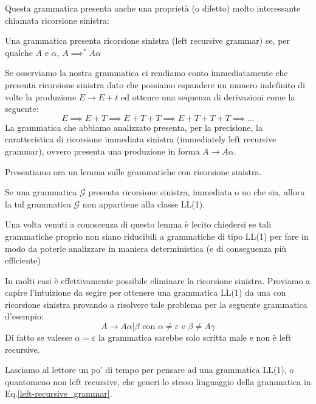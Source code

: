 \documentclass[class=book, crop=false, oneside, 12pt]{standalone}
\begin{document}
Questa grammatica presenta anche una proprietà (o difetto) molto interessante chiamata ricorsione sinistra:
\begin{definition}
    Una grammatica presenta ricorsione sinistra (left recursive grammar) se, per qualche \(A\) e \(\alpha\), \(A \implies^* A\alpha\)
\end{definition}

Se osserviamo la nostra grammatica ci rendiamo conto immediatamente che presenta ricorsione sinistra dato che possiamo espandere un numero indefinito di volte la produzione \(E \to E+t\) ed ottenre una sequenza di derivazioni come la seguente:
\begin{equation*}
    E \implies E+T \implies E+T+T \implies E+T+T+T \implies \dots
\end{equation*}
La grammatica che abbiamo analizzato presenta, per la precisione, la caratteristica di ricorsione immediata sinistra (immediately left recursive grammar), ovvero presenta una produzione in forma \(A \to A\alpha\).

Presentiamo ora un lemma sulle grammatiche con ricorsione sinistra.
\begin{lemma}
    Se una grammatica \(\mathcal{G}\) presenta ricorsione sinistra, immediata o no che sia, allora la tal grammatica \(\mathcal{G}\) non appartiene alla classe LL(1).
\end{lemma}
Una volta venuti a conoscenza di questo lemma è lecito chiedersi se tali grammatiche proprio non siano riducibili a grammatiche di tipo LL(1) per fare in modo da poterle analizzare in maniera deterministica (e di conseguenza più efficiente)

In molti casi è effettivamente possibile eliminare la ricorsione sinistra. 
Proviamo a capire l'intuizione da segire per ottenere una grammatica LL(1) da una con ricorsione sinistra provando a risolvere tale problema per la seguente grammatica d'esempio:
\begin{equation}
    \label{left-recursive_grammar}
    A \to A \alpha | \beta \textrm{  con  } \alpha \neq \varepsilon \textrm{  e  } \beta \neq A \gamma
\end{equation}
Di fatto se valesse \(\alpha = \varepsilon\) la grammatica sarebbe solo scritta male e non è left recursive.

Lasciamo al lettore un po' di tempo per pensare ad una grammatica LL(1), o quantomeno non left recursive, che generi lo stesso linguaggio della grammatica in Eq.\ref{left-recursive_grammar}.
\end{document}
